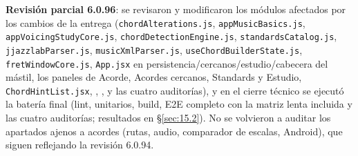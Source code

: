 \documentclass[a4paper,11pt,oneside]{report}
\newcommand{\Sref}[1]{\S\ref{#1}}
\begin{document}
\textbf{Revisión parcial 6.0.96}: se revisaron y modificaron los módulos afectados por los cambios de la entrega (\lstinline!chordAlterations.js!, \lstinline!appMusicBasics.js!, \lstinline!appVoicingStudyCore.js!, \lstinline!chordDetectionEngine.js!, \lstinline!standardsCatalog.js!, \lstinline!jjazzlabParser.js!, \lstinline!musicXmlParser.js!, \lstinline!useChordBuilderState.js!, \lstinline!fretWindowCore.js!, \lstinline!App.jsx! en persistencia/cercanos/estudio/cabecera del mástil, los paneles de Acorde, Acordes cercanos, Standards y Estudio, \lstinline!ChordHintList.jsx!, \texttt{}, \texttt{}, \texttt{} y las cuatro auditorías), y en el cierre técnico se ejecutó la batería final (lint, unitarios, build, E2E completo con la matriz lenta incluida y las cuatro auditorías; resultados en \Sref{sec:15.2}). No se volvieron a auditar los apartados ajenos a acordes (rutas, audio, comparador de escalas, Android), que siguen reflejando la revisión 6.0.94.
\endgroup
\end{document}
